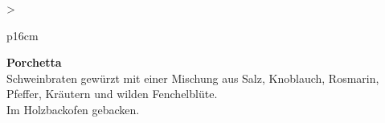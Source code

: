 \documentclass[
  beamerpaper,
  DIV=11,
  numbers=noendperiod,
  aspectratio=54]{scrreprt}
\begin{document}
\begin{table}

\caption{\label{tbl-panel-fleisch2}Porchetta}\begin{minipage}[t]{\linewidth}

\tabularnewline

\fontsize{16}{18}\selectfont
\begin{tabular}{>{\raggedright\arraybackslash}p{16cm}}
\toprule
\begingroup\fontsize{18}{20}\selectfont \textbf{Porchetta}\endgroup\\
\midrule
Schweinbraten gewürzt mit einer Mischung aus Salz, Knoblauch, Rosmarin, Pfeffer, Kräutern und wilden Fenchelblüte.\\
Im Holzbackofen gebacken.\\
\bottomrule
\end{tabular}

\end{minipage}%
\newline
\begin{minipage}[t]{\linewidth}


\end{minipage}%

\end{table}
\end{document}
